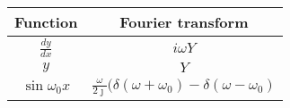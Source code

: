    \begin{tabular}{|c|c|} 
      \hline
\textbf{Function} & \textbf{Fourier transform}\\\hline
         $\frac{dy}{dx}$& $i \omega Y$ \\\hline
          $y$&$Y$\\\hline
          $\sin{\omega_0 x}$& $\frac{\omega}{2\jmath}(\delta(\omega+\omega_0)-\delta(\omega-\omega_0)$  \\ \hline
    \end{tabular}
